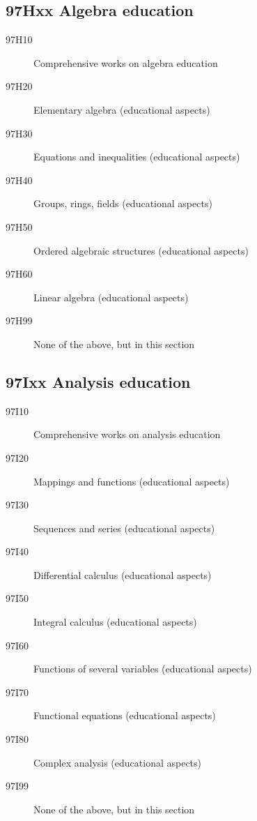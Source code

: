 \subsection*{97Hxx  Algebra education }\label{97Hxx}
\begin{description}  
\item [97H10]\label{97H10} Comprehensive works on algebra education
\item [97H20]\label{97H20} Elementary algebra (educational aspects)
\item [97H30]\label{97H30} Equations and inequalities (educational aspects)
\item [97H40]\label{97H40} Groups, rings, fields (educational aspects)
\item [97H50]\label{97H50} Ordered algebraic structures (educational aspects)
\item [97H60]\label{97H60} Linear algebra (educational aspects)
\item [97H99]\label{97H99} None of the above, but in this section
\end{description}
\subsection*{97Ixx  Analysis education }\label{97Ixx}
\begin{description}  
\item [97I10]\label{97I10} Comprehensive works on analysis education
\item [97I20]\label{97I20} Mappings and functions (educational aspects)
\item [97I30]\label{97I30} Sequences and series (educational aspects)
\item [97I40]\label{97I40} Differential calculus (educational aspects)
\item [97I50]\label{97I50} Integral calculus (educational aspects)
\item [97I60]\label{97I60} Functions of several variables (educational aspects)
\item [97I70]\label{97I70} Functional equations (educational aspects)
\item [97I80]\label{97I80} Complex analysis (educational aspects)
\item [97I99]\label{97I99} None of the above, but in this section
\end{description}
